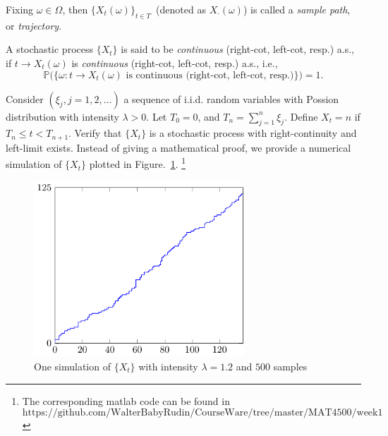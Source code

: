 \begin{definition}
Fixing $\omega\in\Omega$, then $\{X_t(\omega)\}_{t\in T}$~(denoted as $X_{\cdot}(\omega)$) is called a \emph{sample path}, or \emph{trajectory}. 
\end{definition}
\begin{definition}[Continuous]
A stochastic process $\{X_t\}$ is said to be \emph{continuous} (right-cot, left-cot, resp.) a.s., if
$t\to X_t(\omega)$ is \emph{continuous} (right-cot, left-cot, resp.) a.s., i.e.,
\[
\mathbb{P}
\bigg(
\{
\omega: t\to X_t(\omega)\text{ is continuous (right-cot, left-cot, resp.)}
\}
\bigg)=1.
\]
\end{definition}

\begin{example}
Consider $(\xi_j, j=1,2,\ldots)$ a sequence of i.i.d. random variables with Possion distribution with intensity $\lambda>0$.
Let $T_0=0$, and $T_n = \sum_{j=1}^n\xi_j$.
Define $X_t = n$ if $T_n \le t< T_{n+1}$.
Verify that $\{X_t\}$ is a stochastic process with right-continuity and left-limit exists.
Instead of giving a mathematical proof, we provide a numerical simulation of $\{X_t\}$ plotted in Figure.~\ref{fig:1:1}.
\footnote{The corresponding matlab code can be found in 
\[
\mbox{https://github.com/WalterBabyRudin/CourseWare/tree/master/MAT4500/week1}
\]}
\end{example}
\begin{figure}
\centering
\includegraphics[width=0.7\textwidth]{week1/figure_2.pdf}
\caption{One simulation of $\{X_t\}$ with intensity $\lambda=1.2$ and $500$ samples}
\label{fig:1:1}
\end{figure}














